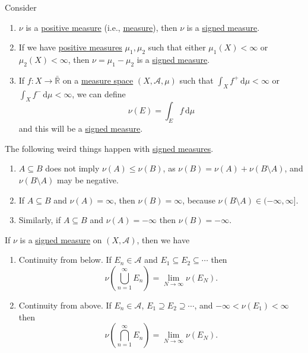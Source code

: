 \begin{eg}
	Consider
	\begin{enumerate}
		\item \(\nu\) is a \hyperref[def:signed-measure]{positive measure} (i.e., \hyperref[def:measure]{measure}), then \(\nu\) is a \hyperref[def:signed-measure]{signed measure}.
		\item If we have \hyperref[def:signed-measure]{positive measures} \(\mu_1,\mu_2\) such that either \(\mu_1(X) < \infty\) or \(\mu_2(X) < \infty\), then \(\nu = \mu_1 - \mu_2\) is a \hyperref[def:signed-measure]{signed measure}.
		\item If \(f \colon X \to \bar{\mathbb{R}}\) on a \hyperref[def:measure-space]{measure space} \((X,\mathcal{A},\mu)\) such that \(\int_X f^+ \,\mathrm{d} \mu < \infty\) or \(\int_X f^- \,\mathrm{d} \mu < \infty\), we can define
		      \[
			      \nu(E) = \int_E f \,\mathrm{d} \mu
		      \]
		      and this will be a \hyperref[def:signed-measure]{signed measure}.
	\end{enumerate}
\end{eg}

\begin{note}
	The following weird things happen with \hyperref[def:signed-measure]{signed measures}.
	\begin{enumerate}
		\item \(A \subseteq B\) does not imply \(\nu(A) \leq \nu(B)\), as \(\nu(B) = \nu(A) + \nu(B \setminus A)\), and \(\nu(B \setminus A)\) may be negative.
		\item If \(A \subseteq B\) and \(\nu(A) = \infty\), then \(\nu(B) = \infty\), because \(\nu(B \setminus A) \in (-\infty,\infty]\).
		\item Similarly, if \(A \subseteq B\) and \(\nu(A) = -\infty\) then \(\nu(B) = -\infty\).
	\end{enumerate}
\end{note}

\begin{lemma}\label{lemma:signed-cont-above-below}
	If \(\nu\) is a \hyperref[def:signed-measure]{signed measure} on \((X, \mathcal{A})\), then we have
	\begin{enumerate}
		\item\label{lma:signed-continuity-from-below} Continuity from below. If \(E_n \in \mathcal{A}\) and \(E_1 \subseteq E_2 \subseteq \cdots\) then
		\[
			\nu\left( \bigcup_{n=1}^\infty E_n \right)  = \lim_{N \to \infty} \nu(E_N).
		\]
		\item\label{lma:signed-continuity-from-above} Continuity from above. If \(E_n \in \mathcal{A}\), \(E_1 \supseteq E_2 \supseteq \cdots\),
		and \(-\infty < \nu(E_1) < \infty\) then
		\[
			\nu\left( \bigcap_{n=1}^\infty E_n \right)  = \lim_{N \to \infty} \nu(E_N).
		\]
	\end{enumerate}
\end{lemma}

